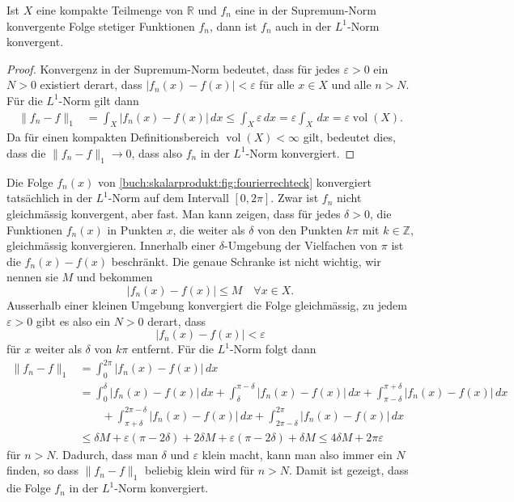 \begin{satz}
Ist $X$ eine kompakte Teilmenge von $\mathbb{R}$ und $f_n$ eine
in der Supremum-Norm konvergente Folge stetiger Funktionen $f_n$,
dann ist $f_n$ auch in der $L^1$-Norm konvergent.
\end{satz}

\begin{proof}
Konvergenz in der Supremum-Norm bedeutet, dass für jedes $\varepsilon>0$
ein $N>0$ existiert derart, dass $|f_n(x)-f(x)|<\varepsilon$ für alle
$x\in X$ und alle $n>N$.
Für die $L^1$-Norm gilt dann
\begin{align*}
\|f_n-f\|_1
&=
\int_X |f_n(x) - f(x)|\,dx
\le
\int_X \varepsilon \,dx
=
\varepsilon \int_X \,dx
=
\varepsilon \operatorname{vol}(X).
\end{align*}
Da für einen kompakten Definitionsbereich $\operatorname{vol}(X)<\infty$
gilt, bedeutet dies, dass die $\|f_n-f\|_1\to 0$, dass also $f_n$ in
der $L^1$-Norm konvergiert.
\end{proof}

\begin{beispiel}
Die Folge $f_n(x)$ von \eqref{buch:skalarprodukt:fig:fourierrechteck}
konvergiert tatsächlich in der $L^1$-Norm auf dem Intervall $[0,2\pi]$.
Zwar ist $f_n$ nicht gleichmässig konvergent, aber fast.
Man kann zeigen, dass für jedes $\delta>0$, die Funktionen
$f_n(x)$ in Punkten $x$, die weiter als $\delta$ von den
Punkten $k\pi$ mit $k\in\mathbb{Z}$, gleichmässig konvergieren.
Innerhalb einer $\delta$-Umgebung der Vielfachen von $\pi$ ist die
$f_n(x)-f(x)$ beschränkt.
Die genaue Schranke ist nicht wichtig, wir nennen sie $M$ und bekommen
\[
|f_n(x)-f(x)|
\le M
\quad\forall x\in X.
\]
Ausserhalb einer kleinen Umgebung konvergiert die Folge gleichmässig,
zu jedem $\varepsilon>0$ gibt es also ein $N>0$ derart, dass
\[
|f_n(x)-f(x)|<\varepsilon
\]
für $x$ weiter als $\delta$ von $k\pi$ entfernt.
Für die $L^1$-Norm folgt dann
\begin{align*}
\|f_n-f\|_1
&=
\int_0^{2\pi} |f_n(x)-f(x)|\,dx
\\
&=
\int_0^\delta |f_n(x)-f(x)|\,dx
+
\int_\delta^{\pi-\delta} |f_n(x)-f(x)|\,dx
+
\int_{\pi-\delta}^{\pi+\delta} |f_n(x)-f(x)|\,dx
\\
&\qquad
+
\int_{\pi+\delta}^{2\pi-\delta} |f_n(x)-f(x)|\,dx
+
\int_{2\pi-\delta}^{2\pi} |f_n(x)-f(x)|\,dx
\\
&\le
\delta M
+
\varepsilon (\pi -2\delta)
+
2\delta M
+
\varepsilon (\pi -2\delta)
+
\delta M
\le
4\delta M + 2\pi\varepsilon
\end{align*}
für $n>N$.
Dadurch, dass man $\delta$ und $\varepsilon$ klein macht, kann man
also immer ein $N$ finden, so dass $\|f_n-f\|_1$ beliebig klein wird
für $n>N$.
Damit ist gezeigt, dass die Folge $f_n$ in der $L^1$-Norm konvergiert.
\end{beispiel}

